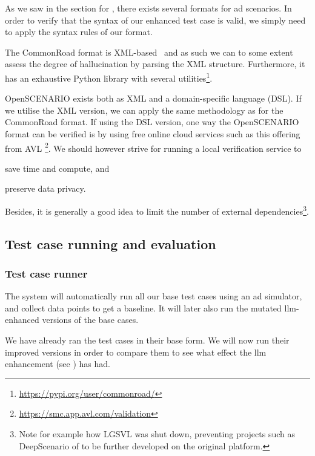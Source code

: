 As we saw in the section for , there exists several formats for
\acrshort{ad} scenarios. In order to verify that the syntax of our enhanced test
case is valid, we simply need to apply the syntax rules of our format. 

The CommonRoad format is XML-based~\cite[720]{commonRoadOG} and as such we can
to some extent assess the degree of hallucination by parsing the XML structure.
Furthermore, it has an exhaustive Python library with several utilities\footnote{\url{https://pypi.org/user/commonroad/}}.

OpenSCENARIO exists both as XML and a domain-specific language (DSL). If we
utilise the XML version, we can apply the same methodology as for the CommonRoad
format. If using the DSL version, one way
the OpenSCENARIO format can be verified is by using free
online cloud services such as this offering from AVL
\footnote{\url{https://smc.app.avl.com/validation}}. We should however strive for
running a local verification service to \begin{inparaenum}
    \item save time and compute,
    and
    \item preserve data privacy.
\end{inparaenum}
Besides, it is generally a good idea to limit the number of external dependencies\footnote{Note for
    example how LGSVL\cite{lgsvl} was shut down, preventing projects such as DeepScenario of
    \citeauthor{DeepScenario} to be further developed on the original platform.}.

\subsection{Test case running and evaluation}

\subsubsection{Test case runner}

The system will automatically run all
our base test cases using an \acrshort{ad} simulator, and collect data points to get a baseline. It
will later also run the mutated \acrshort{llm}-enhanced versions of the base cases.

We have already ran the test cases in their base form. We will now run their
improved versions in order to compare them to see what effect the \acrshort{llm}
enhancement (see ) has had.

